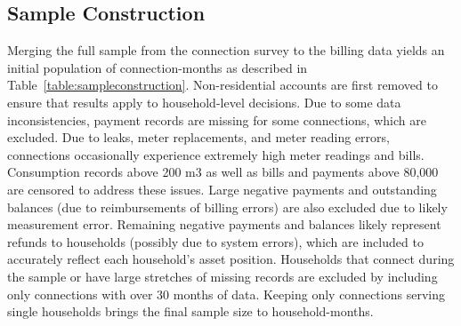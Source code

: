 \documentclass[12pt]{article}
\begin{document}



% 


\subsection{Sample Construction}\label{appendix:sampleconstruction}

Merging the full sample from the connection survey to the billing data yields an initial population of connection-months as described in Table~\ref{table:sampleconstruction}.  Non-residential accounts are first removed to ensure that results apply to household-level decisions.  Due to some data inconsistencies, payment records are missing for some connections, which are excluded.  Due to leaks, meter replacements, and meter reading errors, connections occasionally experience extremely high meter readings and bills.  Consumption records above 200 m3 as well as bills and payments above 80,000 are censored to address these issues.  Large negative payments and outstanding balances (due to reimbursements of billing errors) are also excluded due to likely measurement error.  Remaining negative payments and balances likely represent refunds to households (possibly due to system errors), which are included to accurately reflect each household's asset position.  Households that connect during the sample or have large stretches of missing records are excluded by including only connections with over 30 months of data.  Keeping only connections serving single households brings the final sample size to household-months.
\end{document}
